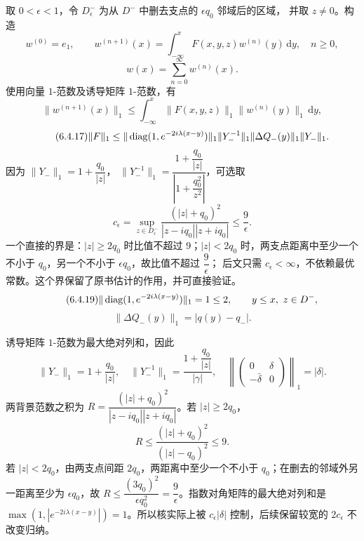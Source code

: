 \documentclass[lang=cn,scheme=chinese,mode=simple,device=normal,color=blue,
math=cm,thmcnt=section,12pt]{elegantbook}
\newcommand{\dd}{\,\mathrm{d}}
\newcommand{\eqq}[2]{\tag{#1}\label{eq:#1}#2}
\begin{document}
取 $0<\epsilon<1$，令 $D^-_\epsilon$ 为从 $D^-$ 中删去支点的 $\epsilon q_0$ 邻域后的区域，
并取 $z\ne0$。构造
\begin{equation}\eqq{6.4.14}{w^{(0)}=e_1,\qquad w^{(n+1)}(x)=\int_{-\infty}^x F(x,y,z)w^{(n)}(y)\dd y,\quad n\ge0,}\end{equation}
\begin{equation}\eqq{6.4.15}{w(x)=\sum\limits_{n=0}^\infty w^{(n)}(x).}\end{equation}
使用向量 $1$-范数及诱导矩阵 $1$-范数，有
\begin{equation}\eqq{6.4.16}{\|w^{(n+1)}(x)\|_1\le\int_{-\infty}^x\|F(x,y,z)\|_1\|w^{(n)}(y)\|_1\dd y,}\end{equation}
\begin{equation}\eqq{6.4.17}{\|F\|_1\le\|\diag(1,e^{-2i\lambda(x-y)})\|_1\|Y_-^{-1}\|_1\|\Delta Q_-(y)\|_1\|Y_-\|_1.}\end{equation}
因为 $\|Y_-\|_1=1+\dfrac{q_0}{|z|}$，
$\|Y_-^{-1}\|_1=\dfrac{1+\dfrac{q_0}{|z|}}{|1+\dfrac{q_0^2}{z^2}|}$，可选取
\begin{equation}\eqq{6.4.18}{c_\epsilon=\sup_{z\in D^-_\epsilon}\dfrac{(|z|+q_0)^2}{|z-iq_0||z+iq_0|}
        \le\dfrac{9}{\epsilon}.}\end{equation}
一个直接的界是：$|z|\ge2q_0$ 时比值不超过 $9$；$|z|<2q_0$ 时，两支点距离中至少一个不小于 $q_0$，另一个不小于 $\epsilon q_0$，故比值不超过 $\dfrac{9}{\epsilon}$；
后文只需 $c_\epsilon<\infty$，不依赖最优常数。这个界保留了原书估计的作用，并可直接验证。
\begin{equation}\eqq{6.4.19}{\|\diag(1,e^{-2i\lambda(x-y)})\|_1=1\le2,\qquad y\le x,\ z\in D^-,}\end{equation}
\begin{equation}\eqq{6.4.20}{\|\Delta Q_-(y)\|_1=|q(y)-q_-|.}\end{equation}

\begin{callout}[计算：范数估计的实际列和及常数界]
    诱导矩阵 $1$-范数为最大绝对列和，因此
    \[
        \|Y_-\|_1=1+\dfrac{q_0}{|z|},\quad
        \|Y_-^{-1}\|_1=\dfrac{1+\dfrac{q_0}{|z|}}{|\gamma|},\quad
        \left\|\begin{pmatrix}0&\delta\\-\bar\delta&0\end{pmatrix}\right\|_1=|\delta|.
    \]
    两背景范数之积为 $R=\dfrac{(|z|+q_0)^2}{|z-iq_0||z+iq_0|}$。若 $|z|\ge2q_0$，
    \[
        R\le\dfrac{(|z|+q_0)^2}{(|z|-q_0)^2}\le9.
    \]
    若 $|z|<2q_0$，由两支点间距 $2q_0$，两距离中至少一个不小于 $q_0$；在删去的邻域外另一距离至少为 $\epsilon q_0$，故 $R\le\dfrac{(3q_0)^2}{\epsilon q_0^2}=\dfrac{9}{\epsilon}$。指数对角矩阵的最大绝对列和是 $\max(1,|e^{-2i\lambda(x-y)}|)=1$。所以核实际上被 $c_\epsilon|\delta|$ 控制，后续保留较宽的 $2c_\epsilon$ 不改变归纳。
\end{callout}
\end{document}
